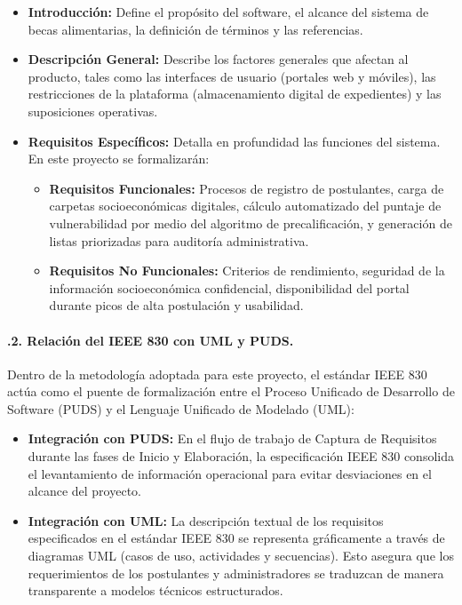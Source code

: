 \begin{itemize}
    \item \textbf{Introducción:} Define el propósito del software, el alcance del sistema de becas alimentarias, la definición de términos y las referencias.

    \item \textbf{Descripción General:} Describe los factores generales que afectan al producto, tales como las interfaces de usuario (portales web y móviles), las restricciones de la plataforma (almacenamiento digital de expedientes) y las suposiciones operativas.

    \item \textbf{Requisitos Específicos:} Detalla en profundidad las funciones del sistema. En este proyecto se formalizarán:
    \begin{itemize}
        \item \textbf{Requisitos Funcionales:} Procesos de registro de postulantes, carga de carpetas socioeconómicas digitales, cálculo automatizado del puntaje de vulnerabilidad por medio del algoritmo de precalificación, y generación de listas priorizadas para auditoría administrativa.
        \item \textbf{Requisitos No Funcionales:} Criterios de rendimiento, seguridad de la información socioeconómica confidencial, disponibilidad del portal durante picos de alta postulación y usabilidad.
    \end{itemize}
\end{itemize}

\paragraph{.2. Relación del IEEE 830 con UML y PUDS.}\label{sec:ieee830_uml_puds}
Dentro de la metodología adoptada para este proyecto, el estándar IEEE 830 actúa como el puente de formalización entre el Proceso Unificado de Desarrollo de Software (PUDS) y el Lenguaje Unificado de Modelado (UML):

\begin{itemize}
    \item \textbf{Integración con PUDS:} En el flujo de trabajo de Captura de Requisitos durante las fases de Inicio y Elaboración, la especificación IEEE 830 consolida el levantamiento de información operacional para evitar desviaciones en el alcance del proyecto.

    \item \textbf{Integración con UML:} La descripción textual de los requisitos especificados en el estándar IEEE 830 se representa gráficamente a través de diagramas UML (casos de uso, actividades y secuencias). Esto asegura que los requerimientos de los postulantes y administradores se traduzcan de manera transparente a modelos técnicos estructurados.
\end{itemize}

